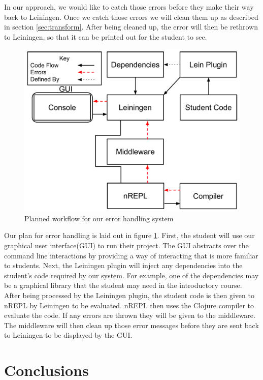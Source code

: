 \documentclass[12pt]{article}
\newcommand{\comment}[1]{{\bf \tt  {#1}}}
\newcommand{\emcomment}[1]{\textcolor{ForestGreen}{\comment{Elena: {#1}}}}
\newcommand{\escomment}[1]{\textcolor{BlueViolet}{\comment{Emma: {#1}}}}
\begin{document}
In our approach, we would like to catch those errors before they make their way back to Leiningen. Once we catch those errors we will clean them up as described in section \ref{sec:transform}. After being cleaned up, the error will then be rethrown to Leiningen, so that it can be printed out for the student to see.

\begin{figure}[h]
 \includegraphics[width=12cm]{OurErrorHandlingSystem.pdf}
 \centering
  \caption{Planned workflow for our error handling system}
 \label{fig:OurSystem}
\end{figure}

Our plan for error handling is laid out in figure \ref{fig:OurSystem}. First, the student will use our graphical user interface(GUI) to run their project. The GUI abstracts over the command line interactions by providing a way of interacting that is more familiar to students. Next, the Leiningen plugin will inject any dependencies into the student's code required by our system. For example, one of the dependencies may be a graphical library that the student may need in the introductory course. After being processed by the Leiningen plugin, the student code is then given to nREPL by Leiningen to be evaluated. nREPL then uses the Clojure compiler to evaluate the code. If any errors are thrown they will be given to the middleware. The middleware will then clean up those error messages before they are sent back to Leiningen to be displayed by the GUI.

\section{Conclusions}\label{sec:conclusion}





\end{document}
